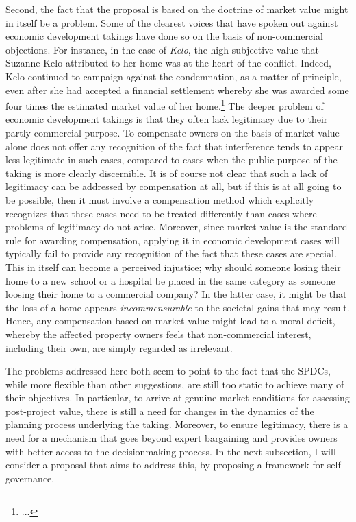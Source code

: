{Second, the fact that the proposal is based on the doctrine of market value might in itself be a problem. Some of the clearest voices that have spoken out against economic development takings have done so on the basis of non-commercial objections. For instance, in the case of {\it Kelo}, the high subjective value that Suzanne Kelo attributed to her home was at the heart of the conflict. Indeed, Kelo continued to campaign against the condemnation, as a matter of principle, even after she had accepted a financial settlement whereby she was awarded some four times the estimated market value of her home.\footnote{...} The deeper problem of economic development takings is that they often lack legitimacy due to their partly commercial purpose. To compensate owners on the basis of market value alone does not offer any recognition of the fact that interference tends to appear less legitimate in such cases, compared to cases when the public purpose of the taking is more clearly discernible. It is of course not clear that such a lack of legitimacy can be addressed by compensation at all, but if this is at all going to be possible, then it must involve a compensation method which explicitly recognizes that these cases need to be treated differently than cases where problems of legitimacy do not arise. Moreover, since market value is the standard rule for awarding compensation, applying it in economic development cases will typically fail to provide any recognition of the fact that these cases are special. This in itself can become a perceived injustice; why should someone losing their home to a new school or a hospital be placed in the same category as someone loosing their home to a commercial company? In the latter case, it might be that the loss of a home appears {\it incommensurable} to the societal gains that may result. Hence, any compensation based on market value might lead to a moral deficit, whereby the affected property owners feels that non-commercial interest, including their own, are simply regarded as irrelevant.
}

The problems addressed here both seem to point to the fact that the SPDCs, while more flexible than other suggestions, are still too static to achieve many of their objectives. In particular, to arrive at genuine market conditions for assessing post-project value, there is still a need for changes in the dynamics of the planning process underlying the taking. Moreover, to ensure legitimacy, there is a need for a mechanism that goes beyond expert bargaining and provides owners with better access to the decisionmaking process. In the next subsection, I will consider a proposal that aims to address this, by proposing a framework for self-governance. 

